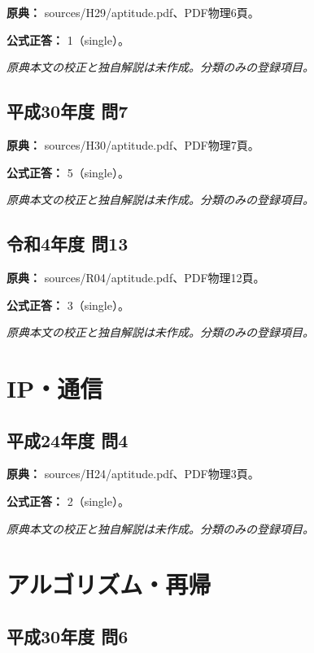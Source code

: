 \noindent\textbf{原典：} sources/H29/aptitude.pdf、PDF物理6頁。

\textbf{公式正答：} 1（single）。

\par\textit{原典本文の校正と独自解説は未作成。分類のみの登録項目。}

\subsection{平成30年度 問7}
\label{q:h30-reg-apt-07}

\noindent\textbf{原典：} sources/H30/aptitude.pdf、PDF物理7頁。

\textbf{公式正答：} 5（single）。

\par\textit{原典本文の校正と独自解説は未作成。分類のみの登録項目。}

\subsection{令和4年度 問13}
\label{q:r04-reg-apt-13}

\noindent\textbf{原典：} sources/R04/aptitude.pdf、PDF物理12頁。

\textbf{公式正答：} 3（single）。

\par\textit{原典本文の校正と独自解説は未作成。分類のみの登録項目。}

\section{IP・通信}

\subsection{平成24年度 問4}
\label{q:h24-reg-apt-04}

\noindent\textbf{原典：} sources/H24/aptitude.pdf、PDF物理3頁。

\textbf{公式正答：} 2（single）。

\par\textit{原典本文の校正と独自解説は未作成。分類のみの登録項目。}

\section{アルゴリズム・再帰}

\subsection{平成30年度 問6}
\label{q:h30-reg-apt-06}

